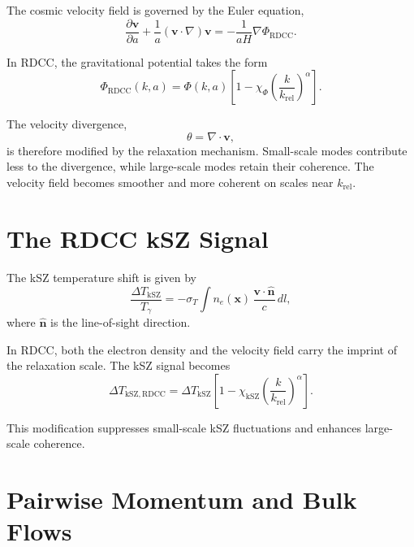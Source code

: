\documentclass[11pt,a4paper]{article}
\begin{document}
The cosmic velocity field is governed by the Euler equation,
\begin{equation}
    \frac{\partial \mathbf{v}}{\partial a}
    + \frac{1}{a} (\mathbf{v} \cdot \nabla)\mathbf{v}
    = -\frac{1}{aH} \nabla \Phi_{\mathrm{RDCC}}.
\end{equation}

In RDCC, the gravitational potential takes the form
\begin{equation}
    \Phi_{\mathrm{RDCC}}(k,a)
    = \Phi(k,a)
      \left[
        1 - \chi_{\Phi}
        \left(\frac{k}{k_{\mathrm{rel}}}\right)^{\alpha}
      \right].
\end{equation}

The velocity divergence,
\begin{equation}
    \theta = \nabla \cdot \mathbf{v},
\end{equation}
is therefore modified by the relaxation mechanism. Small-scale modes contribute 
less to the divergence, while large-scale modes retain their coherence. The 
velocity field becomes smoother and more coherent on scales near $k_{\mathrm{rel}}$.
\section{The RDCC kSZ Signal}

The kSZ temperature shift is given by
\begin{equation}
    \frac{\Delta T_{\mathrm{kSZ}}}{T_{\gamma}}
    = -\sigma_{T}
      \int n_{e}(\mathbf{x})\,
      \frac{\mathbf{v} \cdot \hat{\mathbf{n}}}{c}\,
      dl,
\end{equation}
where $\hat{\mathbf{n}}$ is the line-of-sight direction.

In RDCC, both the electron density and the velocity field carry the imprint of the 
relaxation scale. The kSZ signal becomes
\begin{equation}
    \Delta T_{\mathrm{kSZ,RDCC}}
    = \Delta T_{\mathrm{kSZ}}
      \left[
        1 - \chi_{\mathrm{kSZ}}
        \left(\frac{k}{k_{\mathrm{rel}}}\right)^{\alpha}
      \right].
\end{equation}

This modification suppresses small-scale kSZ fluctuations and enhances large-scale 
coherence.
\section{Pairwise Momentum and Bulk Flows}
\end{document}
